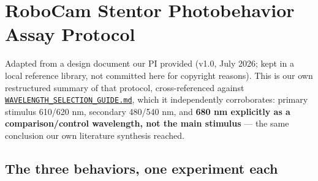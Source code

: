 \documentclass[
]{article}
\author{}
\date{}
\begin{document}
\hypertarget{robocam-stentor-photobehavior-assay-protocol}{%
\section{RoboCam Stentor Photobehavior Assay
Protocol}\label{robocam-stentor-photobehavior-assay-protocol}}

Adapted from a design document our PI provided (v1.0, July 2026; kept in
a local reference library, not committed here for copyright reasons).
This is our own restructured summary of that protocol, cross-referenced
against
\href{WAVELENGTH_SELECTION_GUIDE.md}{\texttt{WAVELENGTH\_SELECTION\_GUIDE.md}},
which it independently corroborates: primary stimulus 610/620 nm,
secondary 480/540 nm, and \textbf{680 nm explicitly as a
comparison/control wavelength, not the main stimulus} --- the same
conclusion our own literature synthesis reached.

\hypertarget{the-three-behaviors-one-experiment-each}{%
\subsection{The three behaviors, one experiment
each}\label{the-three-behaviors-one-experiment-each}}
\end{document}
